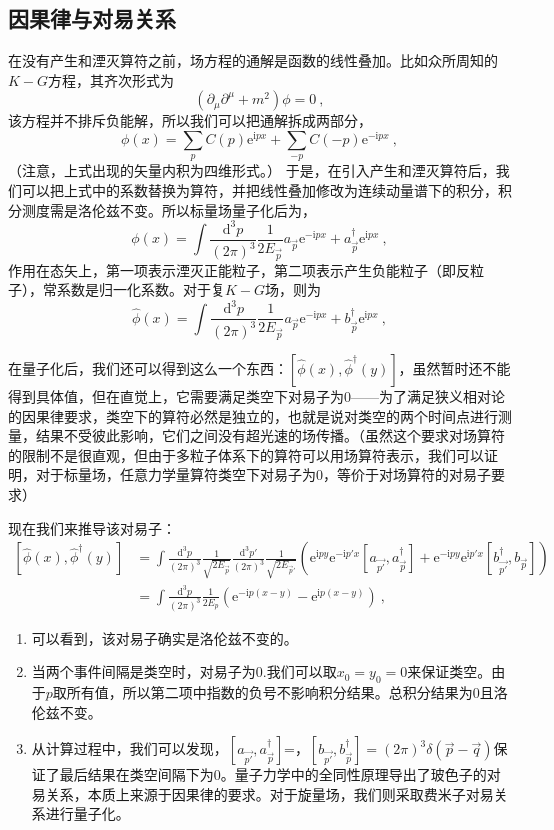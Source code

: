 \subsection{因果律与对易关系}
在没有产生和湮灭算符之前，场方程的通解是函数的线性叠加。比如众所周知的$K-G$方程，其齐次形式为
$$(∂_μ∂^μ+m^2)ϕ=0~,$$
该方程并不排斥负能解，所以我们可以把通解拆成两部分，
$$ϕ(x)=∑_pC(p)\mathrm e ^{\mathrm {i} px}+∑_{-p}C(-p)\mathrm e ^{-\mathrm {i} px}~,$$
（注意，上式出现的矢量内积为四维形式。）
于是，在引入产生和湮灭算符后，我们可以把上式中的系数替换为算符，并把线性叠加修改为连续动量谱下的积分，积分测度需是洛伦兹不变。所以标量场量子化后为，
\begin{equation}
ϕ (x)=∫\frac{\mathrm d^3 p}{(2π )^3}\frac {1}{2E_{\vec p}} a_\vec p\mathrm e^{-\mathrm ipx}+a_\vec p^†\mathrm e^{\mathrm ipx}~,
\end{equation}
作用在态矢上，第一项表示湮灭正能粒子，第二项表示产生负能粒子（即反粒子），常系数是归一化系数。对于复$K-G$场，则为
\begin{equation}
\hat ϕ (x)=∫\frac{\mathrm d^3 p}{(2π )^3}\frac {1}{2E_{\vec p}} a_\vec p\mathrm e^{-\mathrm ipx}+b_\vec p^†\mathrm e^{\mathrm ipx}~,
\end{equation}




在量子化后，我们还可以得到这么一个东西：$[\hat{ϕ}(x),\hat{ϕ}^†(y)]$，虽然暂时还不能得到具体值，但在直觉上，它需要满足类空下对易子为0——为了满足狭义相对论的因果律要求，类空下的算符必然是独立的，也就是说对类空的两个时间点进行测量，结果不受彼此影响，它们之间没有超光速的场传播。（虽然这个要求对场算符的限制不是很直观，但由于多粒子体系下的算符可以用场算符表示，我们可以证明，对于标量场，任意力学量算符类空下对易子为0，等价于对场算符的对易子要求）

现在我们来推导该对易子：
\begin{equation}
\begin{aligned}
[\hat{ϕ}(x),\hat{ϕ}^†(y)]&=∫\frac{\mathrm d^3p}{(2π )^3}\frac {1}{\sqrt{2 E_{\vec p}}}\frac{\mathrm d^3p'}{(2π )^3}\frac {1}{\sqrt{2 E_{\vec p'}}}(\mathrm {e}^{\mathrm {i}py}\mathrm {e}^{-\mathrm {i}p'x}[a_{\vec {p'}},a^†_{\vec p}]+ \mathrm e^{-\mathrm i py}\mathrm e^{\mathrm i p'x}[b^†_{\vec {p'}},b_{{\vec p}}])\\
&=∫ \frac {\mathrm d^3 p}{(2 π)^3}\frac {1}{2 E_p}(\mathrm e^{-\mathrm i p(x-y)}-\mathrm e^{\mathrm i p(x-y)})~,
\end{aligned}
\end{equation}
\begin{enumerate}
\item 可以看到，该对易子确实是洛伦兹不变的。
\item 当两个事件间隔是类空时，对易子为0.我们可以取$x_0=y_0=0$来保证类空。由于$p$取所有值，所以第二项中指数的负号不影响积分结果。总积分结果为0且洛伦兹不变。
\item 从计算过程中，我们可以发现，$[a_{\vec {p'}},a^†_{\vec p}]$=，$[b_{\vec {p'}},b^†_{\vec p}]=(2π)^3δ(\vec p-\vec q)$保证了最后结果在类空间隔下为$0$。量子力学中的全同性原理导出了玻色子的对易关系，本质上来源于因果律的要求。对于旋量场，我们则采取费米子对易关系进行量子化。
\end{enumerate}
